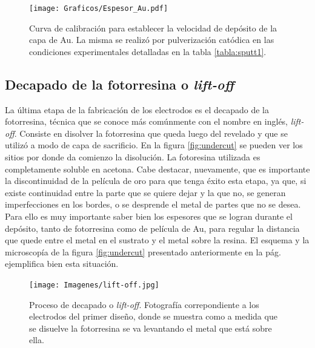 					   		\begin{figure}[th!]
					   		\begin{center}
							\texttt{[image: Graficos/Espesor\_Au.pdf]}
							\caption[Curva de calibración para el espesor de los electrodos]{Curva de calibración para establecer la velocidad de depósito de la capa de Au. La misma se realizó por pulverización catódica en las condiciones experimentales detalladas en la tabla \ref{tabla:sputt1}.}
							\label{fig:calibracionAu}
							\end{center}
							\end{figure}		  
		
	\subsection{Decapado de la fotorresina o\textit{ lift-off}}

		 La última etapa de la fabricación de los electrodos es el decapado de la fotorresina, técnica que se conoce más comúnmente con el nombre en inglés, \textit{lift-off}. Consiste en disolver la fotorresina que queda luego del revelado y que se utilizó a modo de capa de sacrificio. En la figura \ref{fig:undercut} se pueden ver los sitios por donde da comienzo la disolución. La fotoresina utilizada es completamente soluble en acetona. Cabe destacar, nuevamente, que es importante la discontinuidad de la película de oro para que tenga éxito esta etapa, ya que, si existe continuidad entre la parte que se quiere dejar y la que no, se generan imperfecciones en los bordes, o se desprende el metal de partes que no se desea. Para ello es muy importante saber bien los espesores que se logran durante el depósito, tanto de fotorresina como de película de Au, para regular la distancia que quede entre el metal en el sustrato y el metal sobre la resina. El esquema y la microscopía de la figura \ref{fig:undercut} presentado anteriormente en la pág. \pageref{fig:undercut} ejemplifica bien esta situación.

					  \begin{figure}[ht!]
					  \begin{center}
					  \texttt{[image: Imagenes/lift-off.jpg]}
					  \caption[Proceso de decapado o\textit{ lift-off}]{Proceso de decapado o\textit{ lift-off}. Fotografía correpondiente a los electrodos del primer diseño, donde se muestra como a medida que se disuelve la fotorresina se va levantando el metal que está sobre ella.}
					  \label{fig:ultrasonido}
					  \end{center}
					  \end{figure}

